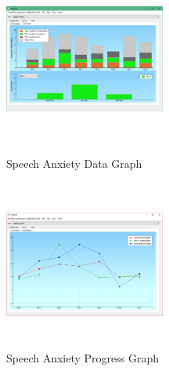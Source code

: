 \documentclass[a4paper,10pt]{article}
\begin{document}
\begin{figure}[H]
	\centering
	\begin{minipage}{0.45\textwidth}
		\centering
		\includegraphics[width=200px, height=210px, keepaspectratio]{qtSpeechGraph.png}
		\caption{Speech Anxiety Data Graph}
		\label{fig:qtSpeechGraph}
	\end{minipage}\hfill
	\begin{minipage}{0.45\textwidth}
		\centering
		\includegraphics[width=200px, height=210px, keepaspectratio]{qtSpeechProgress.png}
		\caption{Speech Anxiety Progress Graph}
		\label{fig:qtSpeechProgress}
	\end{minipage}
\end{figure}
\pagebreak
\end{document}
